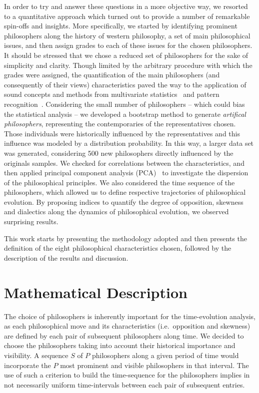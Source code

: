 \documentclass[%
 aip,
 jmp,%
 amsmath,amssymb,
 reprint,%
]{revtex4-1}
\begin{document}
In order to try and answer these questions in a more objective way, we
resorted to a quantitative approach which turned out to provide a
number of remarkable spin-offs and insights.  More specifically, we
started by identifying prominent philosophers along the history of
western philosophy, a set of main philosophical issues, and then
assign grades to each of these issues for the chosen philosophers.  It
should be stressed that we chose a reduced set of philosophers for the
sake of simplicity and clarity.  Though limited by the arbitrary
procedure with which the grades were assigned, the quantification of
the main philosophers (and consequently of their views)
characteristics paved the way to the application of sound concepts and
methods from multivariate statistics~\cite{Papoulis, Wichern,
Therrien} and pattern recognition~\cite{Duda, Costa}.  Considering the
small number of philosophers -- which could bias the statistical
analysis -- we developed a bootstrap method to generate
\emph{artifical philosophers}, representing the contemporaries of the
representatives chosen. Those individuals were
historically influenced by the representatives and this influence was
modeled by a distribution probability. In this way, a larger data set
was generated, considering 500 new philosophers directly influenced by
the originals samples. We checked for
correlations between the characteristics, and then applied principal
component analysis (PCA)~\cite{Costa} to investigate the dispersion of
the philosophical principles.  We also considered the time sequence of
the philosophers, which allowed us to define respective trajectories
of philosophical evolution.  By proposing indices to quantify the
degree of opposition, skewness and dialectics along the dynamics of
philosophical evolution, we observed surprising results.

This work starts by presenting the methodology adopted and then
presents the definition of the eight philosophical characteristics
chosen, followed by the description of the results and discussion.


\section{Mathematical Description}

The choice of philosophers is inherently important for the
time-evolution analysis, as each philosophical move and its
characteristics (i.e.\ opposition and skewness) are defined by each
pair of subsequent philosophers along time.  We decided to choose the
philosophers taking into account their historical importance and
visibility.  A sequence $S$ of $P$ philosophers along a given period
of time would incorporate the $P$ most prominent and visible
philosophers in that interval.  The use of such a criterion to build
the time-sequence for the philosophers implies in not necessarily
uniform time-intervals between each pair of subsequent entries.
\end{document}
